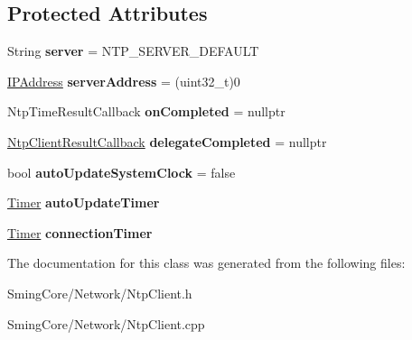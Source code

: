 \subsection*{Protected Attributes}
\begin{DoxyCompactItemize}
\item 
\hypertarget{class_ntp_client_a3b8cfcd355c2100d3108e009e5a91d65}{}String {\bfseries server} = N\+T\+P\+\_\+\+S\+E\+R\+V\+E\+R\+\_\+\+D\+E\+F\+A\+U\+L\+T\label{class_ntp_client_a3b8cfcd355c2100d3108e009e5a91d65}

\item 
\hypertarget{class_ntp_client_a6d87e3e0b5c26d80a7bfe05e53c97f04}{}\hyperlink{class_i_p_address}{I\+P\+Address} {\bfseries server\+Address} = (uint32\+\_\+t)0\label{class_ntp_client_a6d87e3e0b5c26d80a7bfe05e53c97f04}

\item 
\hypertarget{class_ntp_client_aa59e45eab7e751bb8ee6d2a8585d4875}{}Ntp\+Time\+Result\+Callback {\bfseries on\+Completed} = nullptr\label{class_ntp_client_aa59e45eab7e751bb8ee6d2a8585d4875}

\item 
\hypertarget{class_ntp_client_a8c248c8594feb698893b0df65bb98ad9}{}\hyperlink{class_delegate}{Ntp\+Client\+Result\+Callback} {\bfseries delegate\+Completed} = nullptr\label{class_ntp_client_a8c248c8594feb698893b0df65bb98ad9}

\item 
\hypertarget{class_ntp_client_a3788a373550ccc201532d658c6326cd1}{}bool {\bfseries auto\+Update\+System\+Clock} = false\label{class_ntp_client_a3788a373550ccc201532d658c6326cd1}

\item 
\hypertarget{class_ntp_client_a4b68b70348203e1d13705de352bc5394}{}\hyperlink{class_timer}{Timer} {\bfseries auto\+Update\+Timer}\label{class_ntp_client_a4b68b70348203e1d13705de352bc5394}

\item 
\hypertarget{class_ntp_client_af98a2f994584ce9c20f951560c4825f3}{}\hyperlink{class_timer}{Timer} {\bfseries connection\+Timer}\label{class_ntp_client_af98a2f994584ce9c20f951560c4825f3}

\end{DoxyCompactItemize}


The documentation for this class was generated from the following files\+:\begin{DoxyCompactItemize}
\item 
Sming\+Core/\+Network/Ntp\+Client.\+h\item 
Sming\+Core/\+Network/Ntp\+Client.\+cpp\end{DoxyCompactItemize}
